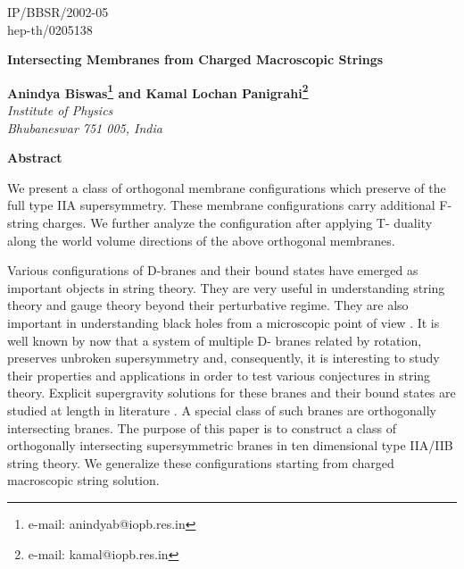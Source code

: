 \documentclass[a4paper,12pt,fleqn,cite,epsfig]{article}
\begin{document}
\topmargin 0pt
\oddsidemargin 0mm

\renewcommand{\thefootnote}{\fnsymbol{footnote}}
\begin{titlepage}
\begin{flushright}
IP/BBSR/2002-05\\
hep-th/0205138
\end{flushright}

\vspace{5mm}
\begin{center}
{\Large \bf Intersecting Membranes from Charged Macroscopic Strings}
\vspace{6mm}

{\bf Anindya Biswas\footnote{e-mail: anindyab@iopb.res.in} 
and Kamal Lochan Panigrahi\footnote{e-mail: kamal@iopb.res.in}}\\
\vspace{5mm}
{\em Institute of Physics\\ 
Bhubaneswar 751 005, India}\\
\vspace{3mm}


\end{center}
\vspace{5mm}
\centerline{{\bf{Abstract}}}
\vspace{5mm}
We present a class of orthogonal membrane configurations
which preserve \coordHE{} of the full type IIA supersymmetry. 
These membrane configurations carry additional F-string charges.
We further analyze the \coordHE{} configuration after applying T- duality 
along the world volume directions of the above orthogonal membranes.


\end{titlepage}
\newpage
Various configurations of D-branes and their bound
states \cite{witten,li,dougla,kamal1} have emerged as important objects 
in string theory. They are very useful in understanding 
string theory and gauge theory beyond their perturbative regime. 
They are also important in understanding black holes from 
a microscopic point of view \cite{maldacena}. It is well known 
by now that a system of multiple D- branes related by \coordHE{} 
rotation, preserves unbroken supersymmetry \cite{douglas} and, 
consequently, it is interesting to study their properties and applications
in order to test various conjectures in string theory. Explicit 
supergravity solutions for these branes and their bound states 
are studied at length in literature \cite{myers,gaunt}. 
A special class of such 
branes are orthogonally intersecting branes. The purpose of this paper
is to construct a class of orthogonally intersecting supersymmetric
branes in ten dimensional type IIA/IIB string theory. We generalize these 
configurations starting from charged macroscopic string solution. 
\end{document}
